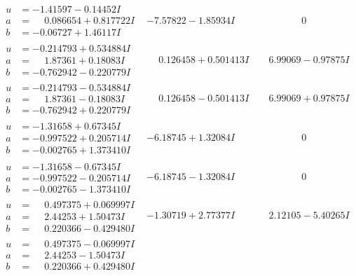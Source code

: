 \documentclass[1p]{elsarticle_modified}
\theoremstyle{definition}
\begin{document}
$$\begin{array}{c|c|c}
\begin{aligned}
u &= -1.41597 - 0.14452 I \\
a &= \phantom{-}0.086654 + 0.817722 I \\
b &= -0.06727 + 1.46117 I\end{aligned}
 & -7.57822 - 1.85934 I & \phantom{-0.000000 } 0 \\ \hline\begin{aligned}
u &= -0.214793 + 0.534884 I \\
a &= \phantom{-}1.87361 + 0.18083 I \\
b &= -0.762942 - 0.220779 I\end{aligned}
 & \phantom{-}0.126458 + 0.501413 I & \phantom{-}6.99069 - 0.97875 I \\ \hline\begin{aligned}
u &= -0.214793 - 0.534884 I \\
a &= \phantom{-}1.87361 - 0.18083 I \\
b &= -0.762942 + 0.220779 I\end{aligned}
 & \phantom{-}0.126458 - 0.501413 I & \phantom{-}6.99069 + 0.97875 I \\ \hline\begin{aligned}
u &= -1.31658 + 0.67345 I \\
a &= -0.997522 + 0.205714 I \\
b &= -0.002765 + 1.373410 I\end{aligned}
 & -6.18745 + 1.32084 I & \phantom{-0.000000 } 0 \\ \hline\begin{aligned}
u &= -1.31658 - 0.67345 I \\
a &= -0.997522 - 0.205714 I \\
b &= -0.002765 - 1.373410 I\end{aligned}
 & -6.18745 - 1.32084 I & \phantom{-0.000000 } 0 \\ \hline\begin{aligned}
u &= \phantom{-}0.497375 + 0.069997 I \\
a &= \phantom{-}2.44253 + 1.50473 I \\
b &= \phantom{-}0.220366 - 0.429480 I\end{aligned}
 & -1.30719 + 2.77377 I & \phantom{-}2.12105 - 5.40265 I \\ \hline\begin{aligned}
u &= \phantom{-}0.497375 - 0.069997 I \\
a &= \phantom{-}2.44253 - 1.50473 I \\
b &= \phantom{-}0.220366 + 0.429480 I\end{aligned}

\end{array}$$
\end{document}
